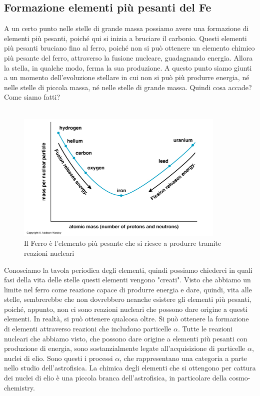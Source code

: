 \documentclass[a4paper,11pt]{article}
\begin{document}
\subsection{Formazione elementi più pesanti del Fe}
    A un certo punto nelle stelle di grande massa possiamo avere una formazione di elementi più pesanti, poiché qui si inizia a bruciare il carbonio. Questi elementi più pesanti bruciano fino al ferro, poiché non si può ottenere un elemento chimico più pesante del ferro, attraverso la fusione nucleare, guadagnando energia. Allora la stella, in qualche modo, ferma la sua produzione. A questo punto siamo giunti a un momento dell'evoluzione stellare in cui non si può più produrre energia, né nelle stelle di piccola massa, né nelle stelle di grande massa. Quindi cosa accade? Come siamo fatti?\\ 
    \\
    \newpage
    \begin{figure}[h!!]
        \centering
        \includegraphics[width=10cm]{lezione 28 novembre/ferrolimite.png}
        \caption{Il Ferro è l'elemento più pesante che si riesce a produrre tramite reazioni nucleari}
        \label{lezione 28 novembre/ferrolimite.png}
    \end{figure}
    Conosciamo la tavola periodica degli elementi, quindi possiamo chiederci in quali fasi della vita delle stelle questi elementi vengono "creati". Visto che abbiamo un limite nel ferro come reazione capace di produrre energia e dare, quindi, vita alle stelle, sembrerebbe che non dovrebbero neanche esistere gli elementi più pesanti, poiché, appunto, non ci sono reazioni nucleari che possono dare origine a questi elementi. In realtà, si può ottenere qualcosa oltre. Si può ottenere la formazione di elementi attraverso reazioni che includono particelle $\alpha$. Tutte le reazioni nucleari che abbiamo visto, che possono dare origine a elementi più pesanti con produzione di energia, sono sostanzialmente legate all'acquisizione di particelle  $\alpha$, nuclei di elio. Sono questi i processi $\alpha$, che rappresentano una categoria a parte nello studio dell'astrofisica. La chimica degli elementi che si ottengono per cattura dei nuclei di elio è una piccola branca dell'astrofisica, in particolare della cosmo-chemistry. \\ 
\end{document}
